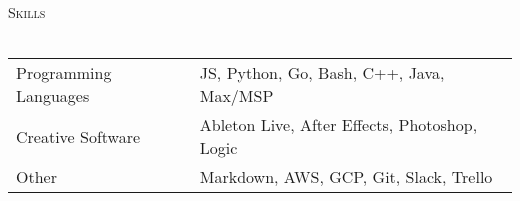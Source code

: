 \documentclass[a4paper]{article}
\newcommand{\lineunder} {
    \vspace*{-8pt} \\
    \hspace*{-18pt} \hrulefill \\
}
\newcommand{\header} [1] {
    {\hspace*{-18pt}\vspace*{6pt} \textsc{#1}}
    \vspace*{-6pt} \lineunder
}
\begin{document}
\noindent
\header{Skills}

\noindent
\begin{tabular}{ l l }
	Programming Languages & JS, Python, Go, Bash, C++, Java, Max/MSP \\
	Creative Software             & Ableton Live, After Effects, Photoshop, Logic    \\
	Other                  & Markdown, AWS, GCP, Git, Slack, Trello        \\
\end{tabular}
\vspace{8mm}
\noindent
\begin{center}
\end{center}
\ 
\end{document}
